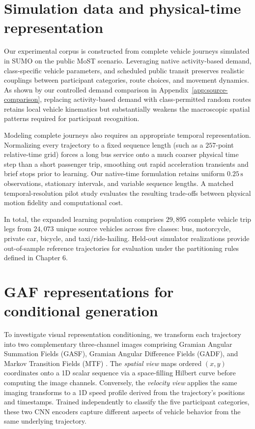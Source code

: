 \section{Simulation data and physical-time representation}

Our experimental corpus is constructed from complete vehicle journeys simulated in SUMO on the public MoST scenario. Leveraging native activity-based demand, class-specific vehicle parameters, and scheduled public transit preserves realistic couplings between participant categories, route choices, and movement dynamics. As shown by our controlled demand comparison in Appendix~\ref{app:source-comparison}, replacing activity-based demand with class-permitted random routes retains local vehicle kinematics but substantially weakens the macroscopic spatial patterns required for participant recognition.

Modeling complete journeys also requires an appropriate temporal representation. Normalizing every trajectory to a fixed sequence length (such as a $257$-point relative-time grid) forces a long bus service onto a much coarser physical time step than a short passenger trip, smoothing out rapid acceleration transients and brief stops prior to learning. Our native-time formulation retains uniform $0.25\,\text{s}$ observations, stationary intervals, and variable sequence lengths. A matched temporal-resolution pilot study evaluates the resulting trade-offs between physical motion fidelity and computational cost.

In total, the expanded learning population comprises $29,895$ complete vehicle trip legs from $24,073$ unique source vehicles across five classes: bus, motorcycle, private car, bicycle, and taxi/ride-hailing. Held-out simulator realizations provide out-of-sample reference trajectories for evaluation under the partitioning rules defined in Chapter 6.

\section{GAF representations for conditional generation}

To investigate visual representation conditioning, we transform each trajectory into two complementary three-channel images comprising Gramian Angular Summation Fields (GASF), Gramian Angular Difference Fields (GADF), and Markov Transition Fields (MTF) \cite{wang,original}. The \textit{spatial view} maps ordered $(x,y)$ coordinates onto a 1D scalar sequence via a space-filling Hilbert curve before computing the image channels. Conversely, the \textit{velocity view} applies the same imaging transforms to a 1D speed profile derived from the trajectory's positions and timestamps. Trained independently to classify the five participant categories, these two CNN encoders capture different aspects of vehicle behavior from the same underlying trajectory.

